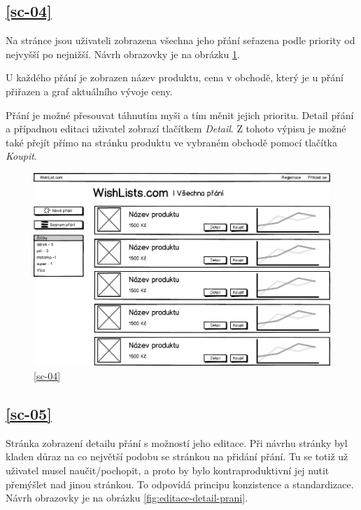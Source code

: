 \subsection{\ref{sc-04}}
\label{sec:wireframe-vsechna-prani}
Na stránce jsou uživateli zobrazena všechna jeho přání seřazena podle priority od nejvyšší po nejnižší. Návrh obrazovky je na obrázku \ref{fig:vsechna-prani}.

U každého přání je zobrazen název produktu, cena v obchodě, který je u přání přiřazen a graf aktuálního vývoje ceny.

Přání je možné přesouvat táhnutím myši a tím měnit jejich prioritu. Detail přání a případnou editaci uživatel zobrazí tlačítkem \emph{Detail}. Z tohoto výpisu je možné také přejít přímo na stránku produktu ve vybraném obchodě pomocí tlačítka \emph{Koupit}.

\begin{figure}[htb]
\begin{center}
\includegraphics[width=130mm]{./pictures/mock/vsechna-prani.png}
\caption{\ref{sc-04}}
\label{fig:vsechna-prani}
\end{center}
\end{figure}

\subsection{\ref{sc-05}}
Stránka zobrazení detailu přání s možností jeho editace. Při návrhu stránky byl kladen důraz na co největší podobu se stránkou na přidání přání. Tu se totiž už uživatel musel naučit/pochopit, a proto by bylo kontraproduktivní jej nutit přemýšlet nad jinou stránkou. To odpovídá principu konzistence a standardizace\cite{molich1990improving}. Návrh obrazovky je na obrázku \ref{fig:editace-detail-prani}.

